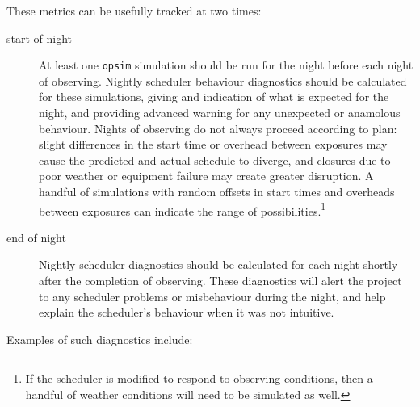 These metrics can be usefully tracked at two times:
\begin{description}
\item[{start of night}] At least one \texttt{opsim} simulation should be run for the night before each night of observing. Nightly scheduler behaviour diagnostics should be calculated for these simulations, giving and indication of what is expected for the night, and providing advanced warning for any unexpected or anamolous behaviour. Nights of observing do not always proceed according to plan: slight differences in the start time or overhead between exposures may cause the predicted and actual schedule to diverge, and closures due to poor weather or equipment failure may create greater disruption. A handful of simulations with random offsets in start times and overheads between exposures can indicate the range of possibilities.\footnote{If the scheduler is modified to respond to observing conditions, then a handful of weather conditions will need to be simulated as well.}
\item[{end of night}] Nightly scheduler diagnostics should be calculated for each night shortly after the completion of observing. These diagnostics will alert the project to any scheduler problems or misbehaviour during the night, and help explain the scheduler's behaviour when it was not intuitive.
\end{description}

Examples of such diagnostics include:

